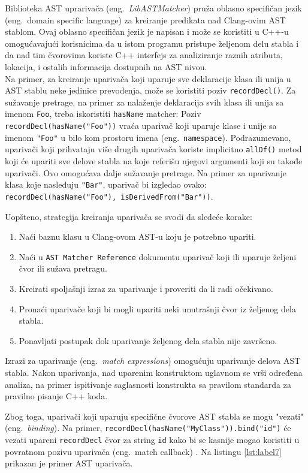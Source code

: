 \documentclass[12pt,oneside]{memoir}
\begin{document}
Biblioteka AST uprariva\v{c}a (eng.~\textit{LibASTMatcher}) pruža oblasno specifičan jezik (eng.~domain specific language) za kreiranje predikata nad Clang-ovim AST stablom. Ovaj oblasno specifičan jezik je napisan i može se koristiti u C++-u omogućavajući korisnicima da u istom programu pristupe željenom delu stabla i da nad tim čvorovima koriste C++ interfejs za analiziranje raznih atributa, lokacija, i ostalih informacija dostupnih na AST nivou.
\\ Na primer, za kreiranje upariva\v{c}a koji uparuje sve deklaracije klasa ili unija u AST stablu neke jedinice prevođenja, može se koristiti poziv \texttt{recordDecl()}. Za sužavanje pretrage, na primer za nalaženje deklaracija svih klasa ili unija sa imenom \texttt{Foo}, treba iskoristiti \texttt{hasName} matcher: Poziv \texttt{recordDecl(hasName("Foo"))} vraća upariva\v{c} koji uparuje klase i unije sa imenom \texttt{"Foo"} u bilo kom prostoru imena (eng.~\texttt{namespace}). Podrazumevano, upariva\v{c}i koji prihvataju više drugih upariva\v{c}a koriste implicitno \texttt{allOf()} metod koji \'{c}e upariti sve delove stabla na koje referi\v{s}u njegovi argumenti koji su takođe upariva\v{c}i. Ovo omogućava dalje sužavanje pretrage. Na primer za uparivanje klasa koje nasleđuju \texttt{"Bar"}, upariva\v{c} bi izgledao ovako: \texttt{recordDecl(hasName("Foo"), isDerivedFrom("Bar"))}.
\par

Uopšteno, strategija kreiranja upariva\v{c}a se svodi da sledeće korake:
\begin{enumerate}
\item Na\'{c}i baznu klasu u Clang-ovom AST-u koju je potrebno upariti.
 
\item Na\'{c}i u \texttt{AST Matcher Reference} dokumentu upariva\v{c} koji ili uparuje \v{z}eljeni čvor ili su\v{z}ava pretragu.
\item Kreirati spoljašnji izraz za uparivanje i proveriti da li radi o\v{c}ekivano.
\item Prona\'{c}i upariva\v{c}e koji bi mogli upariti neki unutrašnji čvor iz željenog dela stabla.
\item Ponavljati postupak dok uparivanje željenog dela stabla nije završeno.
\end{enumerate}

Izrazi za uparivanje (eng.~\textit{match expressions}) omogu\'{c}uju uparivanje delova AST stabla. Nakon uparivanja, nad uparenim konstruktom uglavnom se vr\v{s}i određena analiza, na primer ispitivanje saglasnosti konstrukta sa pravilom standarda za pravilno pisanje C++ koda.
\par
Zbog toga, upariva\v{c}i koji uparuju specifi\v{c}ne čvorove AST stabla se mogu "vezati" (eng.~\textit{binding}). Na primer, \texttt{recordDecl(hasName("MyClass")).bind("id")} će vezati upareni \texttt{recordDecl} čvor za string \texttt{id} kako bi se kasnije mogao koristiti u povratnom pozivu upariva\v{c}a (eng.~match callback) \cite{matchers}. Na listingu \ref{lst:label7} prikazan je primer AST upariva\v{c}a.
\end{document}
